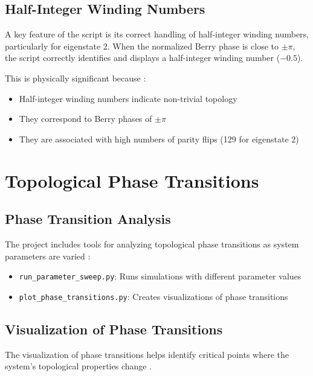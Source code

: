 \documentclass{article}
\begin{document}
\subsection{Half-Integer Winding Numbers}

A key feature of the script is its correct handling of half-integer winding numbers, particularly for eigenstate 2. When the normalized Berry phase is close to $\pm\pi$, the script correctly identifies and displays a half-integer winding number ($-0.5$).

This is physically significant because \cite{Tse2010, Hsieh2009, Zeng2024}:

\begin{itemize}
    \item Half-integer winding numbers indicate non-trivial topology
    \item They correspond to Berry phases of $\pm\pi$
    \item They are associated with high numbers of parity flips (129 for eigenstate 2)
\end{itemize}

\section{Topological Phase Transitions}

\subsection{Phase Transition Analysis}

The project includes tools for analyzing topological phase transitions as system parameters are varied \cite{Moore2010, Qi2010, Wen2017, Chiu2016}:

\begin{itemize}
    \item \texttt{run\_parameter\_sweep.py}: Runs simulations with different parameter values
    \item \texttt{plot\_phase\_transitions.py}: Creates visualizations of phase transitions
\end{itemize}

\subsection{Visualization of Phase Transitions}

The visualization of phase transitions helps identify critical points where the system's topological properties change \cite{Shen2017, Asboth2016}.
\end{document}
